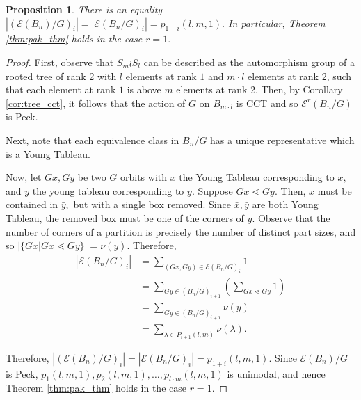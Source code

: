 \documentclass[10 pt]{amsart}
\theoremstyle{plain}
\newtheorem{prop}[thm]{Proposition}
\theoremstyle{definition}
\theoremstyle{remark}
\numberwithin{equation}{section}
\begin{document}
\begin{prop}
\label{prop:rank_gen_fn_wreath_1}
There is an equality $|(\mathcal E(B_n)/G)_i| = |\mathcal E(B_n/G)_i| = p_{1+i}(l,m,1).$ In particular, Theorem \ref{thm:pak_thm} holds in the case $r = 1.$
\end{prop}
\begin{proof}

First, observe that $S_m \wr S_l$ can be described as the automorphism group of a rooted tree of rank 2 with $l$ elements at rank $1$ and $m\cdot l$ elements at rank 2, such that each element at rank $1$ is above $m$ elements at rank 2. Then, by Corollary \ref{cor:tree_cct}, it follows that the action of $G$ on $B_{m \cdot l}$ is CCT and so $\mathcal E^r(B_n/G)$ is Peck.

Next, note that each equivalence class in $B_n/G$ has a unique representative which is a Young Tableau. 

Now, let $Gx,Gy$ be two $G$ orbits with $\bar x$ the Young Tableau corresponding to $x,$ and $\bar y$ the young tableau corresponding to $y.$ Suppose $Gx \lessdot Gy.$ Then, $\bar x$ must be contained in $\bar y,$ but with a single box removed. Since $\bar x,\bar y$ are both Young Tableau, the removed box must be one of the corners of $\bar y$. Observe that the number of corners of a partition is precisely the number of distinct part sizes, and so $|\{Gx|Gx \lessdot Gy\}| = \nu(\bar y).$ Therefore,
\begin{align*}
	|\mathcal E(B_n/G)_i| &= \sum_{(Gx,Gy) \in \mathcal E(B_n/G)_i} 1 
	\\
	&= \sum_{Gy \in (B_n/G)_{i+1}} \left(\sum_{Gx \lessdot Gy}^{} 1 \right) 
	\\
	&= \sum_{Gy \in (B_n/G)_{i+1}}\nu(\bar y) 
	\\
	&=  \sum_{\lambda \in P_{i+1}(l,m)} \nu(\lambda).
\end{align*}

Therefore, $|(\mathcal E(B_n)/G)_i| = |\mathcal E(B_n/G)_i| = p_{1+i}(l,m,1).$ Since $\mathcal E(B_n)/G$ is Peck,
\linebreak
$p_1(l,m,1), p_{2}(l,m,1),\ldots, p_{l\cdot m}(l,m,1)$ is unimodal, and hence Theorem \ref{thm:pak_thm} holds in the case $r = 1.$
\end{proof}
\end{document}
